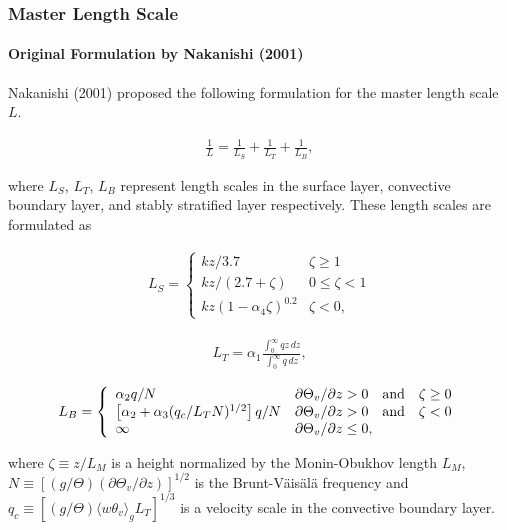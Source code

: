 \hypertarget{master-length-scale}{%
\subsubsection{Master Length Scale}\label{master-length-scale}}

\hypertarget{original-formulation-by-nakanishi-2001}{%
\paragraph{Original Formulation by Nakanishi (2001)}\label{original-formulation-by-nakanishi-2001}}

Nakanishi (2001) proposed the following formulation for the master length scale \(L\).

\begin{eqnarray}\frac{1}{L}=\frac{1}{L_S}+\frac{1}{L_T}+\frac{1}{L_B} \label{p-dif.1}, \end{eqnarray}

where \(L_S\), \(L_T\), \(L_B\) represent length scales in the surface layer, convective boundary layer, and stably stratified layer respectively. These length scales are formulated as

\begin{eqnarray}
L_S=\left\{
    \begin{array}{lr}
      kz/3.7 &\zeta\ge 1\\
      kz/(2.7+\zeta) &0\le\zeta< 1\\
      kz(1-\alpha_4\zeta)^{0.2} &\zeta< 0,
    \end{array}
  \right.
\end{eqnarray}

\begin{eqnarray}L_T=\alpha_1\frac{\displaystyle \int_0^\infty{qz}\,dz}{\displaystyle \int_0^\infty{q}\,dz},\end{eqnarray}

\begin{eqnarray}
L_B=\left\{
    \begin{array}{ll}
      \alpha_2 q/N &\partial\Theta_v/\partial z> 0 \quad\rm{and}\quad\zeta\ge 0\\
      \left[\alpha_2+\alpha_3(q_c/L_TN)^{1/2}\right]q/N &\partial\Theta_v/\partial z> 0 \quad\rm{and}\quad\zeta< 0\\
      \infty &\partial\Theta_v/\partial z\le 0,
    \end{array}
  \right.
\end{eqnarray}

where \(\zeta\equiv z/L_M\) is a height normalized by the Monin-Obukhov length \(L_M\), \(N\equiv\left[(g/\Theta)(\partial\Theta_v/\partial z)\right]^{1/2}\) is the Brunt-Väisälä frequency and
\(q_c\equiv [(g/\Theta)\langle w\theta_v \rangle_gL_T]^{1/3}\) is a velocity scale in the convective boundary layer.

